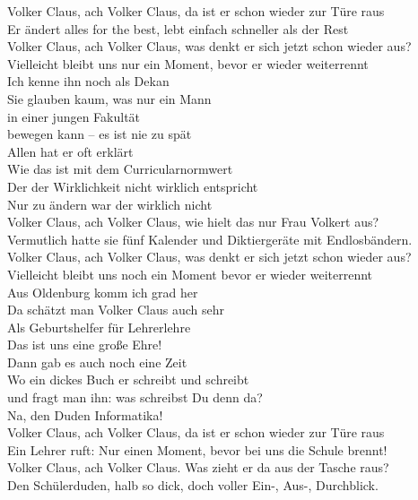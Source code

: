 \documentclass[11pt,a5paper]{article}
\begin{document}
			Volker Claus, ach Volker Claus, da ist er schon wieder zur Türe raus \\
			Er ändert alles for the best, lebt einfach schneller als der Rest \\
			Volker Claus, ach Volker Claus, was denkt er sich jetzt schon wieder aus? \\
			Vielleicht bleibt uns nur ein Moment, bevor er wieder weiterrennt \\
			Ich kenne ihn noch als Dekan \\
			Sie glauben kaum, was nur ein Mann \\
			in einer jungen Fakultät \\
			bewegen kann – es ist nie zu spät \\
			Allen hat er oft erklärt \\
			Wie das ist mit dem Curricularnormwert \\
			Der der Wirklichkeit nicht wirklich entspricht \\
			Nur zu ändern war der wirklich nicht \\
			Volker Claus, ach Volker Claus, wie hielt das nur Frau Volkert aus? \\
			Vermutlich hatte sie fünf Kalender und Diktiergeräte mit Endlosbändern. \\
			Volker Claus, ach Volker Claus, was denkt er sich jetzt schon wieder aus? \\
			Vielleicht bleibt uns noch ein Moment bevor er wieder weiterrennt \\
			Aus Oldenburg komm ich grad her \\
			Da schätzt man Volker Claus auch sehr \\
			Als Geburtshelfer für Lehrerlehre \\
			Das ist uns eine große Ehre! \\
			Dann gab es auch noch eine Zeit \\
			Wo ein dickes Buch er schreibt und schreibt \\
			und fragt man ihn: was schreibst Du denn da? \\
			\glqq Na, den Duden Informatika!\grqq \\
			Volker Claus, ach Volker Claus, da ist er schon wieder zur Türe raus \\
			Ein Lehrer ruft: \glqq Nur einen Moment, bevor bei uns die Schule brennt!\grqq \\
			Volker Claus, ach Volker Claus. Was zieht er da aus der Tasche raus? \\
			Den Schülerduden, halb so dick, doch voller Ein-, Aus-, Durchblick. \\
\end{document}
